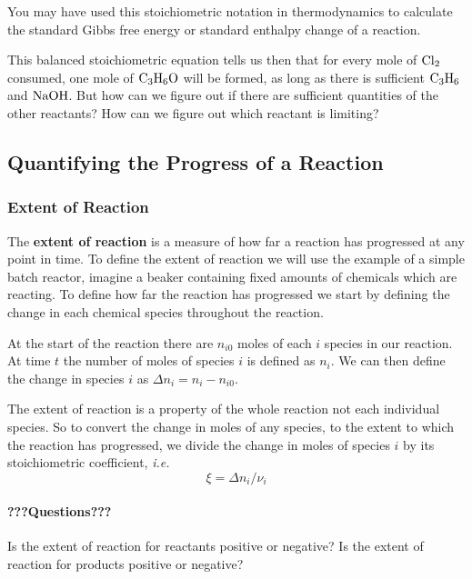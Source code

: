 \documentclass[
]{article}
\begin{document}
You may have used this stoichiometric notation in thermodynamics to calculate the standard Gibbs free energy or standard enthalpy change of a reaction.

This balanced stoichiometric equation tells us then that for every mole of \(\ce{Cl2}\) consumed, one mole of \(\ce{C3H6O}\) will be formed, as long as there is sufficient \(\ce{C3H6}\) and \(\ce{NaOH}\). But how can we figure out if there are sufficient quantities of the other reactants? How can we figure out which reactant is limiting?

\hypertarget{quantifying-the-progress-of-a-reaction}{%
\subsection{Quantifying the Progress of a Reaction}\label{quantifying-the-progress-of-a-reaction}}

\hypertarget{extent-of-reaction}{%
\subsubsection{Extent of Reaction}\label{extent-of-reaction}}

The \textbf{extent of reaction} is a measure of how far a reaction has progressed at any point in time. To define the extent of reaction we will use the example of a simple batch reactor, imagine a beaker containing fixed amounts of chemicals which are reacting. To define how far the reaction has progressed we start by defining the change in each chemical species throughout the reaction.

At the start of the reaction there are \(n_{i0}\) moles of each \(i\) species in our reaction. At time \(t\) the number of moles of species \(i\) is defined as \(n_i\). We can then define the change in species \(i\) as \(\Delta n_i = n_i - n_{i0}\).

The extent of reaction is a property of the whole reaction not each individual species. So to convert the change in moles of any species, to the extent to which the reaction has progressed, we divide the change in moles of species \(i\) by its stoichiometric coefficient, \emph{i.e.}
\[\xi = \Delta n_i/\nu_i\]

\hypertarget{questions}{%
\paragraph{???Questions???}\label{questions}}

Is the extent of reaction for reactants positive or negative?
Is the extent of reaction for products positive or negative?
\end{document}
